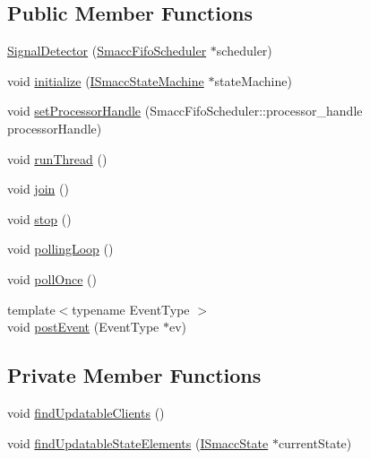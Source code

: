 \subsection*{Public Member Functions}
\begin{DoxyCompactItemize}
\item 
\hyperlink{classsmacc_1_1SignalDetector_a24914014feb0ab01e2452af705ef2774}{Signal\+Detector} (\hyperlink{smacc__fifo__scheduler_8h_a0063e275231c80d5f97df21d17257bf7}{Smacc\+Fifo\+Scheduler} $\ast$scheduler)
\item 
void \hyperlink{classsmacc_1_1SignalDetector_a91ab3cd92d8095cdaf8610b50731f04b}{initialize} (\hyperlink{classsmacc_1_1ISmaccStateMachine}{I\+Smacc\+State\+Machine} $\ast$state\+Machine)
\item 
void \hyperlink{classsmacc_1_1SignalDetector_ac1197a77c32a3b817005391e550ce646}{set\+Processor\+Handle} (Smacc\+Fifo\+Scheduler\+::processor\+\_\+handle processor\+Handle)
\item 
void \hyperlink{classsmacc_1_1SignalDetector_a48b3fee853ddcb25732408b22ecfcf39}{run\+Thread} ()
\item 
void \hyperlink{classsmacc_1_1SignalDetector_a636f704e469bf74b4a9fdb15bd63d5be}{join} ()
\item 
void \hyperlink{classsmacc_1_1SignalDetector_a536ea005ea4ef4632c0c9c1c62c557a3}{stop} ()
\item 
void \hyperlink{classsmacc_1_1SignalDetector_a2665e66cdae9f6533c64bbcecf3fa199}{polling\+Loop} ()
\item 
void \hyperlink{classsmacc_1_1SignalDetector_a9a116479e23259f3a5d5d4a47278afd5}{poll\+Once} ()
\item 
{\footnotesize template$<$typename Event\+Type $>$ }\\void \hyperlink{classsmacc_1_1SignalDetector_a6ab99d99cef8d101e39797a72daeb2b7}{post\+Event} (Event\+Type $\ast$ev)
\end{DoxyCompactItemize}
\subsection*{Private Member Functions}
\begin{DoxyCompactItemize}
\item 
void \hyperlink{classsmacc_1_1SignalDetector_a47ec2df560e2e33758ce3975bece9385}{find\+Updatable\+Clients} ()
\item 
void \hyperlink{classsmacc_1_1SignalDetector_a443234ebdf8cedd45cde725e64639dfe}{find\+Updatable\+State\+Elements} (\hyperlink{classsmacc_1_1ISmaccState}{I\+Smacc\+State} $\ast$current\+State)
\end{DoxyCompactItemize}
